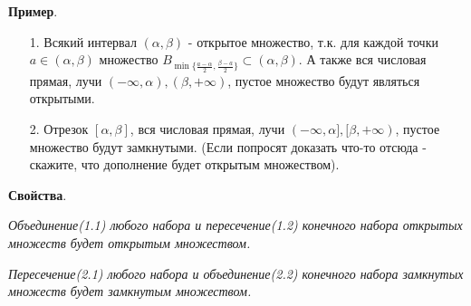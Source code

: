 \documentclass[12pt]{article}
\theoremstyle{definition}
\begin{document}
\textbf{Пример}.

\begin{itemize}
    \item[1.] Всякий интервал $(\alpha,\beta)$ - открытое множество, т.к. для каждой точки $a \in (\alpha, \beta)$ множество $B_{\min\{\frac{a-\alpha}{2}, \frac{\beta-a}{2}\}} \subset (\alpha,\beta)$. А также вся числовая прямая, лучи $(-\infty, \alpha), (\beta, +\infty)$, пустое множество будут являться открытыми.
    \item[2.] Отрезок $[\alpha, \beta]$, вся числовая прямая, лучи $(-\infty, \alpha], [\beta, +\infty)$, пустое множество будут замкнутыми. (Если попросят доказать что-то отсюда - скажите, что дополнение будет открытым множеством).
\end{itemize}

\textbf{Свойства}.

\textit{Объединение(1.1) любого набора и пересечение(1.2) конечного набора открытых множеств будет открытым множеством.}

\textit{Пересечение(2.1) любого набора и объединение(2.2) конечного набора замкнутых множеств будет замкнутым множеством.}
\end{document}
